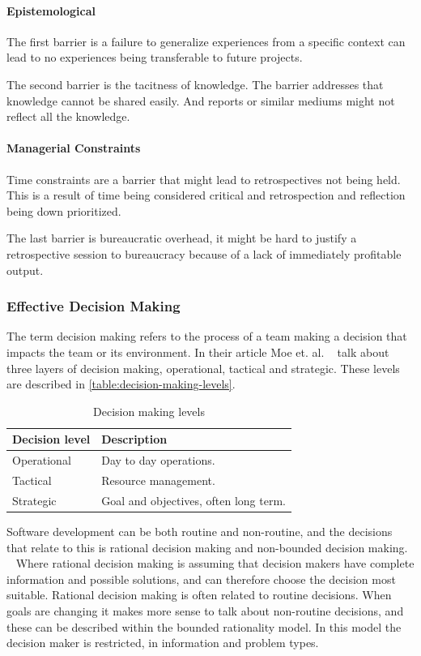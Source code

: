 \paragraph{Epistemological}
The first barrier is a failure to generalize experiences from a specific context can lead to no experiences being transferable to future projects. 

The second barrier is the tacitness of knowledge. The barrier addresses that knowledge cannot be shared easily. And reports or similar mediums might not reflect all the knowledge.

\paragraph{Managerial Constraints}
Time constraints are a barrier that might lead to retrospectives not being held. This is a result of time being considered critical and retrospection and reflection being down prioritized. 

The last barrier is bureaucratic overhead, it might be hard to justify a retrospective session to bureaucracy because of a lack of immediately profitable output.

\subsubsection{Effective Decision Making}
The term decision making refers to the process of a team making a decision that impacts the team or its environment. In their article Moe et. al. ~\cite{Moe2011} talk about three layers of decision making, operational, tactical and strategic. These levels are described in \autoref{table:decision-making-levels}. 

\begin{table}[h]
	\begin{center}
		\caption{Decision making levels}
		\label{table:decision-making-levels}
		\begin{tabular}{l l}
			\hline
			Decision level & Description \\
			\hline
			Operational & Day to day operations. \\
			Tactical & Resource management.\\
			Strategic & Goal and objectives, often long term. \\
			\hline
		\end{tabular}
	\end{center}
\end{table}

Software development can be both routine and non-routine, and the decisions that relate to this is rational decision making and non-bounded decision making. ~\cite{Moe2011} Where rational decision making is assuming that decision makers have complete information and possible solutions, and can therefore choose the decision most suitable. Rational decision making is often related to routine decisions. When goals are changing it makes more sense to talk about non-routine decisions, and these can be described within the bounded rationality model. In this model the decision maker is restricted, in information and problem types. 

